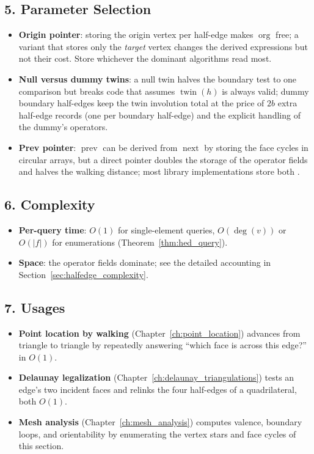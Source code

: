 \subsection{5. Parameter Selection}

\begin{itemize}
  \item \textbf{Origin pointer}: storing the origin vertex per half-edge
    makes $\operatorname{org}$ free; a variant that stores only the
    \emph{target} vertex changes the derived expressions but not their cost.
    Store whichever the dominant algorithms read most.
  \item \textbf{Null versus dummy twins}: a null twin halves the boundary
    test to one comparison but breaks code that assumes
    $\operatorname{twin}(h)$ is always valid; dummy boundary half-edges
    keep the twin involution total at the price of $2b$ extra half-edge
    records (one per boundary half-edge) and the explicit handling of the
    dummy's operators.
  \item \textbf{Prev pointer}: $\operatorname{prev}$ can be derived from
    $\operatorname{next}$ by storing the face cycles in circular arrays, but
    a direct pointer doubles the storage of the operator fields and halves
    the walking distance; most library implementations store both
    \cite{botsch2010,ericson2004}.
\end{itemize}

\subsection{6. Complexity}

\begin{itemize}
  \item \textbf{Per-query time}: $O(1)$ for single-element queries,
    $O(\deg(v))$ or $O(|f|)$ for enumerations (Theorem~\ref{thm:hed_query}).
  \item \textbf{Space}: the operator fields dominate; see the detailed
    accounting in Section~\ref{sec:halfedge_complexity}.
\end{itemize}

\subsection{7. Usages}

\begin{itemize}
  \item \textbf{Point location by walking} (Chapter~\ref{ch:point_location})
    advances from triangle to triangle by repeatedly answering ``which face
    is across this edge?'' in $O(1)$.
  \item \textbf{Delaunay legalization} (Chapter~\ref{ch:delaunay_triangulations})
    tests an edge's two incident faces and relinks the four half-edges of a
    quadrilateral, both $O(1)$.
  \item \textbf{Mesh analysis} (Chapter~\ref{ch:mesh_analysis}) computes
    valence, boundary loops, and orientability by enumerating the vertex
    stars and face cycles of this section.
\end{itemize}

